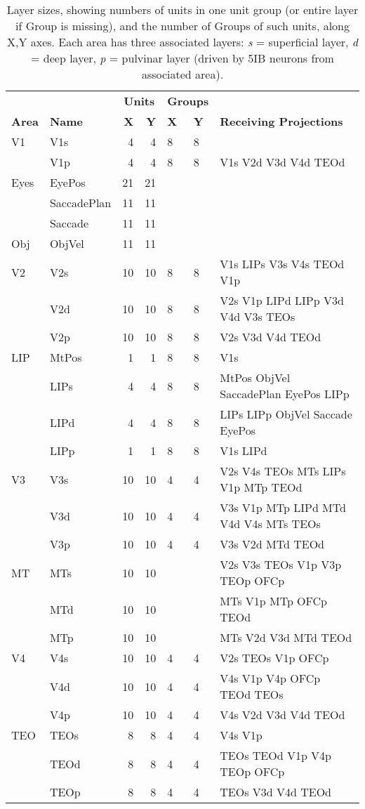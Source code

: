 \documentclass[11pt,twoside]{article}
\newif\myifpdf
\begin{document}
\begin{table}
  \centering
\begin{tabular}{llrrlll}
\hline
     &      & \multicolumn{2}{c}{{\bf Units}} & \multicolumn{2}{c}{{\bf Groups}} & \\
{\bf Area} & {\bf Name} & {\bf X} & {\bf Y} & {\bf X} & {\bf Y} & {\bf Receiving Projections} \\
\hline
V1 & V1s & 4 & 4 & 8 & 8 &  \\
   & V1p & 4 & 4 & 8 & 8 & V1s V2d V3d V4d TEOd  \\
Eyes & EyePos & 21 & 21 & & &  \\
     & SaccadePlan & 11 & 11 & & &  \\
     & Saccade & 11 & 11 & & &  \\
Obj & ObjVel & 11 & 11 & & & \\
V2 & V2s & 10 & 10 & 8 & 8 & V1s LIPs V3s V4s TEOd V1p \\
   & V2d & 10 & 10 & 8 & 8 & V2s V1p LIPd LIPp V3d V4d V3s TEOs \\
   & V2p & 10 & 10 & 8 & 8 & V2s V3d V4d TEOd \\
LIP & MtPos& 1 & 1 & 8 & 8 & V1s \\
    & LIPs & 4 & 4 & 8 & 8 & MtPos ObjVel SaccadePlan EyePos LIPp \\
    & LIPd & 4 & 4 & 8 & 8 & LIPs LIPp ObjVel Saccade EyePos \\
    & LIPp & 1 & 1 & 8 & 8 & V1s LIPd \\
V3 & V3s & 10 & 10 & 4 & 4 & V2s V4s TEOs MTs LIPs V1p MTp TEOd \\
   & V3d & 10 & 10 & 4 & 4 & V3s V1p MTp LIPd MTd V4d V4s MTs TEOs \\
   & V3p & 10 & 10 & 4 & 4 & V3s V2d MTd TEOd \\
MT & MTs & 10 & 10 & & & V2s V3s TEOs V1p V3p TEOp OFCp \\
   & MTd & 10 & 10 & & & MTs V1p MTp OFCp TEOd \\
   & MTp & 10 & 10 & & & MTs V2d V3d MTd TEOd \\
V4 & V4s & 10 & 10 & 4 & 4 & V2s TEOs V1p OFCp \\
   & V4d & 10 & 10 & 4 & 4 & V4s V1p V4p OFCp TEOd TEOs \\
   & V4p & 10 & 10 & 4 & 4 & V4s V2d V3d V4d TEOd \\
TEO & TEOs & 8 & 8 & 4 & 4 & V4s V1p \\
    & TEOd & 8 & 8 & 4 & 4 & TEOs TEOd V1p V4p TEOp OFCp \\
    & TEOp & 8 & 8 & 4 & 4 & TEOs V3d V4d TEOd \\
\hline
\end{tabular}
\caption{\footnotesize Layer sizes, showing numbers of units in one unit group (or entire layer if Group is missing), and the number of Groups of such units, along X,Y axes.  Each area has three associated layers: {\em s} = superficial layer, {\em d} = deep layer, {\em p} = pulvinar layer (driven by 5IB neurons from associated area).}
\label{tab.layer_sizes}
\end{table}
\end{document}
